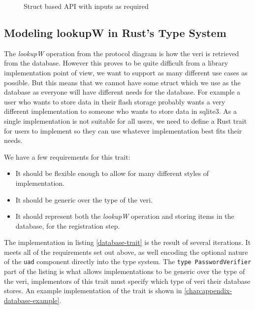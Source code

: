 \begin{figure}[H]

  \caption{Struct based API with inputs as required}
  \label{fig:actual-lib-structure}
\end{figure}

\subsection{Modeling lookupW in Rust’s Type System}
The \textit{lookupW} operation from the protocol diagram is how the \gls{veri} is retrieved from the database.
However this proves to be quite difficult from a library implementation point of view, we want to support as many different use cases as possible.
But this means that we cannot have some struct which we use as the database as everyone will have different needs for the database.
For example a user who wants to store data in their flash storage probably wants a very different implementation to someone who wants to store data in sqlite3.
As a single implementation is not suitable for all users, we need to define a Rust trait for users to implement so they can use whatever implementation best fits their needs.

We have a few requirements for this trait:
\begin{itemize}
  \item{It should be flexible enough to allow for many different styles of implementation.}
  \item{It should be generic over the type of the \gls{veri}.}
  \item{It should represent both the \textit{lookupW} operation and storing items in the database, for the registration step.}
\end{itemize}


The implementation in listing \ref{database-trait} is the result of several iterations.
It meets all of the requirements set out above, as well encoding the optional nature of the \texttt{uad} component directly into the type system.
The \texttt{type PasswordVerifier} part of the listing is what allows implementations to be generic over the type of the \gls{veri}, implementors of this trait must specify which type of \gls{veri} their database stores.
An example implementation of the trait is shown in \cref{chap:appendix-database-example}.

